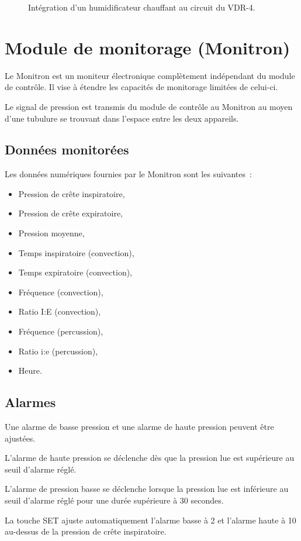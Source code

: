 \begin{figure}
	
	\label{fig:circuit}
	\caption{Intégration d'un humidificateur chauffant au circuit du VDR-4.}
\end{figure}

\section{Module de monitorage (Monitron)}

Le Monitron est un moniteur électronique complètement indépendant du module de
contrôle. Il vise à étendre les capacités de monitorage limitées de celui-ci.

Le signal de pression est transmis du module de contrôle au Monitron au moyen
d'une tubulure se trouvant dans l'espace entre les deux appareils.

\subsection{Données monitorées}

Les données numériques fournies par le Monitron sont les suivantes :

\begin{itemize}
\item Pression de crête inspiratoire,
\item Pression de crête expiratoire,
\item Pression moyenne,
\item Temps inspiratoire (convection),
\item Temps expiratoire (convection),
\item Fréquence (convection),
\item Ratio I:E (convection),
\item Fréquence (percussion),
\item Ratio i:e (percussion),
\item Heure.
\end{itemize}

\subsection{Alarmes}

Une alarme de basse pression et une alarme de haute pression peuvent être ajustées.

L'alarme de haute pression se déclenche dès que la pression lue est supérieure
au seuil d’alarme réglé.

L'alarme de pression basse se déclenche lorsque la pression lue est inférieure
au seuil d’alarme réglé pour une durée supérieure à 30 secondes.

La touche SET ajuste automatiquement l'alarme basse à 2 \cmh et l'alarme haute
à 10 \cmh au-dessus de la pression de crête inspiratoire.
